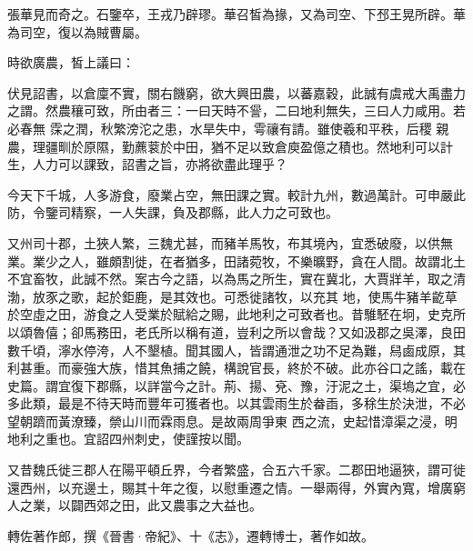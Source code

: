 \begin{pinyinscope}
 張華見而奇之。石鑒卒，王戎乃辟璆。華召皙為掾，又為司空、下邳王晃所辟。華為司空，復以為賊曹屬。



 時欲廣農，皙上議曰：


伏見詔書，以倉廩不實，關右饑窮，欲大興田農，以蕃嘉穀，此誠有虞戒大禹盡力之謂。然農穰可致，所由者三：一曰天時不諐，二曰地利無失，三曰人力咸用。若必春無
 霂之潤，秋繁滂沱之患，水旱失中，雩禳有請。雖使羲和平秩，后稷
 親農，理疆甽於原隰，勤藨蓘於中田，猶不足以致倉庾盈億之積也。然地利可以計生，人力可以課致，詔書之旨，亦將欲盡此理乎？



 今天下千城，人多游食，廢業占空，無田課之實。較計九州，數過萬計。可申嚴此防，令鑒司精察，一人失課，負及郡縣，此人力之可致也。



 又州司十郡，土狹人繁，三魏尤甚，而豬羊馬牧，布其境內，宜悉破廢，以供無業。業少之人，雖頗割徙，在者猶多，田諸菀牧，不樂曠野，貪在人間。故謂北土不宜畜牧，此誠不然。案古今之語，以為馬之所生，實在冀北，大賈牂羊，取之清渤，放豕之歌，起於鉅鹿，是其效也。可悉徙諸牧，以充其
 地，使馬牛豬羊齕草於空虛之田，游食之人受業於賦給之賜，此地利之可致者也。昔騅駓在坰，史克所以頌魯僖；卻馬務田，老氏所以稱有道，豈利之所以會哉？又如汲郡之吳澤，良田數千頃，濘水停洿，人不墾植。聞其國人，皆謂通泄之功不足為難，舄鹵成原，其利甚重。而豪強大族，惜其魚捕之饒，構說官長，終於不破。此亦谷口之謠，載在史篇。謂宜復下郡縣，以詳當今之計。荊、揚、兗、豫，汙泥之土，渠塢之宜，必多此類，最是不待天時而豐年可獲者也。以其雲雨生於畚臿，多稌生於決泄，不必望朝躋而黃潦臻，禜山川而霖雨息。是故兩周爭東
 西之流，史起惜漳渠之浸，明地利之重也。宜詔四州刺史，使謹按以聞。



 又昔魏氏徙三郡人在陽平頓丘界，今者繁盛，合五六千家。二郡田地逼狹，謂可徙還西州，以充邊土，賜其十年之復，以慰重遷之情。一舉兩得，外實內寬，增廣窮人之業，以闢西郊之田，此又農事之大益也。



 轉佐著作郎，撰《晉書·帝紀》、十《志》，遷轉博士，著作如故。




\end{pinyinscope}
